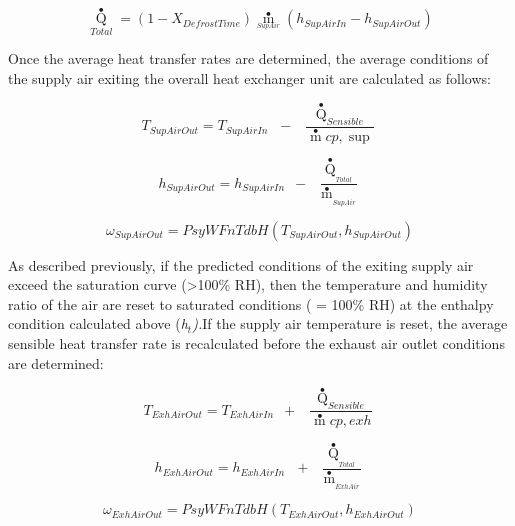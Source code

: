 \begin{equation}
{\mathop Q\limits^ \bullet_{Total}} = (1 - {X_{DefrostTime}}){\mathop m\limits^ \bullet_{_{SupAir}}}({h_{SupAirIn}} - {h_{SupAirOut}})
\end{equation}

Once the average heat transfer rates are determined, the average conditions of the supply air exiting the overall heat exchanger unit are calculated as follows:

\begin{equation}
{T_{SupAirOut}} = {T_{SupAirIn\,}}\,\,\, - \,\,\,\frac{{{{\mathop Q\limits^ \bullet  }_{Sensible}}}}{{\mathop m\limits^ \bullet  cp,\sup }}
\end{equation}

\begin{equation}
{h_{SupAirOut}} = {h_{SupAirIn}}\,\,\, - \,\,\,\frac{{{{\mathop Q\limits^ \bullet  }_{_{Total}}}}}{{{{\mathop m\limits^ \bullet  }_{_{SupAir}}}}}
\end{equation}

\begin{equation}
{\omega_{SupAirOut}} = PsyWFnTdbH({T_{SupAirOut}},{h_{SupAirOut}})
\end{equation}

As described previously, if the predicted conditions of the exiting supply air exceed the saturation curve (\textgreater{}100\% RH), then the temperature and humidity ratio of the air are reset to saturated conditions ( = 100\% RH) at the enthalpy condition calculated above (\emph{h\(_{t}\)).}If the supply air temperature is reset, the average sensible heat transfer rate is recalculated before the exhaust air outlet conditions are determined:

\begin{equation}
{T_{ExhAirOut}} = {T_{ExhAirIn}}\,\,\, + \,\,\,\frac{{{{\mathop Q\limits^ \bullet  }_{Sensible}}}}{{\mathop m\limits^ \bullet  cp,exh}}
\end{equation}

\begin{equation}
{h_{ExhAirOut}} = {h_{ExhAirIn}}\,\,\,\, + \,\,\,\frac{{{{\mathop Q\limits^ \bullet  }_{_{Total}}}}}{{{{\mathop m\limits^ \bullet  }_{_{ExhAir}}}}}
\end{equation}

\begin{equation}
{\omega_{ExhAirOut}} = PsyWFnTdbH({T_{ExhAirOut}},{h_{ExhAirOut}})
\end{equation}

